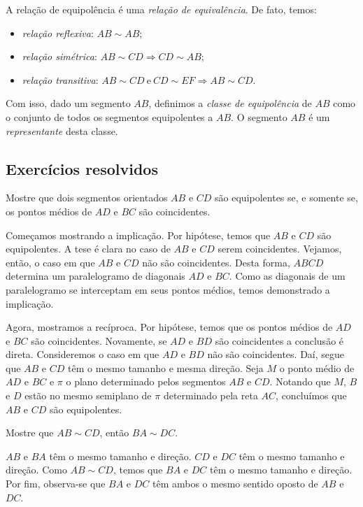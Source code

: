 A relação de equipolência é uma \emph{relação de equivalência}. De fato, temos:
\begin{itemize}
\item \emph{relação reflexiva}: $AB \sim AB$;
\item \emph{relação simétrica}: $AB \sim CD \Rightarrow CD \sim AB$;
\item \emph{relação transitiva}: $AB \sim CD ~ \text{e} ~ CD \sim EF \Rightarrow AB \sim CD$.
\end{itemize}

Com isso, dado um segmento $AB$, definimos a \emph{classe de equipolência} de $AB$ como o conjunto de todos os segmentos equipolentes a $AB$. O segmento $AB$ é um \emph{representante} desta classe.

\subsection*{Exercícios resolvidos}

\begin{exeresol}
  Mostre que dois segmentos orientados $AB$ e $CD$ são equipolentes se, e somente se, os pontos médios de $AD$ e $BC$ são coincidentes.
\end{exeresol}
\begin{resol}
  Começamos mostrando a implicação. Por hipótese, temos que $AB$ e $CD$ são equipolentes. A tese é clara no caso de $AB$ e $CD$ serem coincidentes. Vejamos, então, o caso em que $AB$ e $CD$ não são coincidentes. Desta forma, $ABCD$ determina um paralelogramo de diagonais $AD$ e $BC$. Como as diagonais de um paralelogramo se interceptam em seus pontos médios, temos demonstrado a implicação.

  Agora, mostramos a recíproca. Por hipótese, temos que os pontos médios de $AD$ e $BC$ são coincidentes. Novamente, se $AD$ e $BD$ são coincidentes a conclusão é direta. Consideremos o caso em que $AD$ e $BD$ não são coincidentes. Daí, segue que $AB$ e $CD$ têm o mesmo tamanho e mesma direção. Seja $M$ o ponto médio de $AD$ e $BC$ e $\pi$ o plano determinado pelos segmentos $AB$ e $CD$. Notando que $M$, $B$ e $D$ estão no mesmo semiplano de $\pi$ determinado pela reta $AC$, concluímos que $AB$ e $CD$ são equipolentes.
\end{resol}

\begin{exeresol}
  Mostre que $AB\sim CD$, então $BA\sim DC$.
\end{exeresol}
\begin{resol}
  $AB$ e $BA$ têm o mesmo tamanho e direção. $CD$ e $DC$ têm o mesmo tamanho e direção. Como $AB\sim CD$, temos que $BA$ e $DC$ têm o mesmo tamanho e direção. Por fim, observa-se que $BA$ e $DC$ têm ambos o mesmo sentido oposto de $AB$ e $DC$. 
\end{resol}

